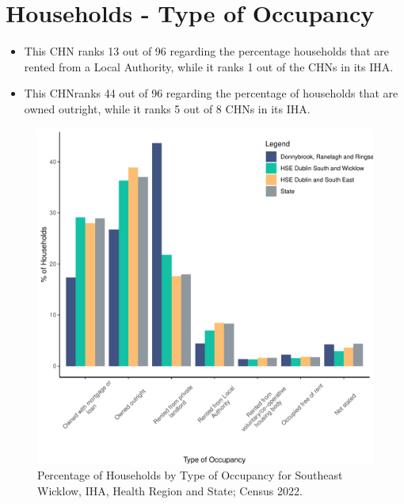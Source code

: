 \documentclass{article}
\begin{document}
\section{Households - Type of Occupancy}\label{sect:Households}
\begin{itemize}
\item This CHN ranks  13 out of 96 regarding the percentage households that are rented from a Local Authority, while it ranks  1 out of the CHNs in its IHA. 
\item This CHNranks  44 out of 96 regarding the percentage of households that are owned outright, while it ranks   5 out of 8 CHNs in its IHA.
\end{itemize}
\begin{figure}[H]
	\centering
	\includegraphics[width = 140mm]{../figures/HouseholdsED.pdf}
	\caption{Percentage of Households by Type of Occupancy for Southeast Wicklow, IHA, Health Region and State; Census 2022.}
	\label{fig:vbnv}
	\end{figure}
\end{document}

